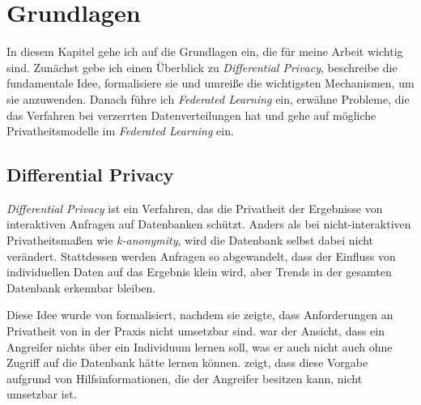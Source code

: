 \chapter{Grundlagen}\label{chap:fundamentals}


In diesem Kapitel gehe ich auf die Grundlagen ein, die für meine Arbeit wichtig sind. Zunächst gebe ich einen Überblick zu \textit{Differential Privacy}, beschreibe die fundamentale Idee, formalisiere sie und umreiße die wichtigsten Mechanismen, um sie anzuwenden. Danach führe ich \textit{Federated Learning} ein, erwähne Probleme, die das Verfahren bei verzerrten Datenverteilungen hat und gehe auf mögliche Privatheitsmodelle im \textit{Federated Learning} ein.

\section{Differential Privacy}


\textit{Differential Privacy} ist ein Verfahren, das die Privatheit der Ergebnisse von interaktiven Anfragen auf Datenbanken schützt. Anders als bei nicht-interaktiven Privatheitsmaßen wie \textit{k-anonymity}, wird die Datenbank selbst dabei nicht verändert. Stattdessen werden Anfragen so abgewandelt, dass der Einfluss von individuellen Daten auf das Ergebnis klein wird, aber Trends in der gesamten Datenbank erkennbar bleiben.

Diese Idee wurde von \textcite{dwork:2006} formalisiert, nachdem sie zeigte, dass Anforderungen an Privatheit von \textcite{dalenius:1977} in der Praxis nicht umsetzbar sind. \citeauthor{dalenius:1977} war der Ansicht, dass ein Angreifer nichts über ein Individuum lernen soll, was er auch nicht auch ohne Zugriff auf die Datenbank hätte lernen können. \citeauthor{dwork:2006} zeigt, dass diese Vorgabe aufgrund von Hilfsinformationen, die der Angreifer besitzen kann, nicht umsetzbar ist. 

